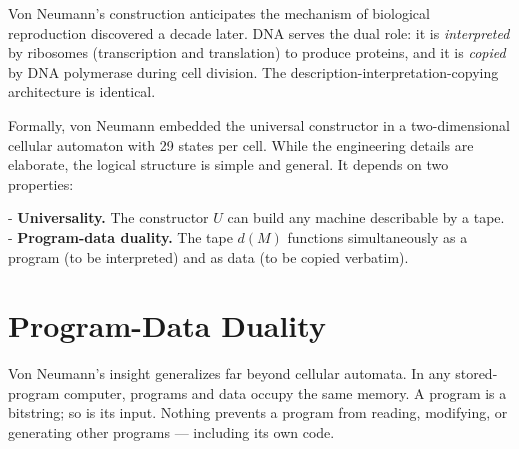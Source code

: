 \begin{remark}
Von Neumann's construction anticipates the mechanism of biological reproduction discovered a decade later. DNA serves the dual role: it is \textit{interpreted} by ribosomes (transcription and translation) to produce proteins, and it is \textit{copied} by DNA polymerase during cell division. The description-interpretation-copying architecture is identical.

Formally, von Neumann embedded the universal constructor in a two-dimensional cellular automaton with 29 states per cell. While the engineering details are elaborate, the logical structure is simple and general. It depends on two properties:

- \textbf{Universality.} The constructor $U$ can build any machine describable by a tape.
- \textbf{Program-data duality.} The tape $d(M)$ functions simultaneously as a program (to be interpreted) and as data (to be copied verbatim).
\end{remark}

\section{Program-Data Duality}

Von Neumann's insight generalizes far beyond cellular automata. In any stored-program computer, programs and data occupy the same memory. A program is a bitstring; so is its input. Nothing prevents a program from reading, modifying, or generating other programs --- including its own code.

